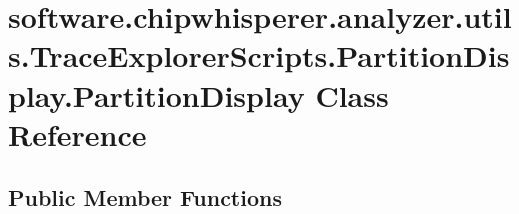 \hypertarget{classsoftware_1_1chipwhisperer_1_1analyzer_1_1utils_1_1TraceExplorerScripts_1_1PartitionDisplay_1_1PartitionDisplay}{}\section{software.\+chipwhisperer.\+analyzer.\+utils.\+Trace\+Explorer\+Scripts.\+Partition\+Display.\+Partition\+Display Class Reference}
\label{classsoftware_1_1chipwhisperer_1_1analyzer_1_1utils_1_1TraceExplorerScripts_1_1PartitionDisplay_1_1PartitionDisplay}
\subsection*{Public Member Functions}
